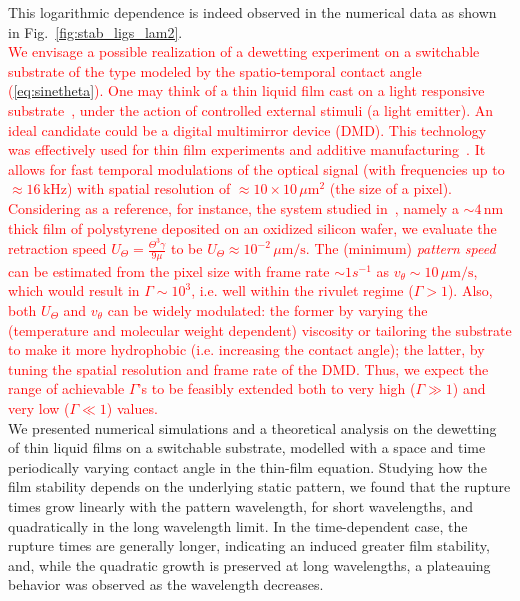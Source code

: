 \documentclass[twocolumn,amsmath,amssymb,showpacs,prl,superscriptaddress]{revtex4-1} %
\newcommand{\REV}[1]{\textcolor{red}{#1}}
\begin{document}
This logarithmic dependence is indeed observed in the numerical data as shown in Fig.~\ref{fig:stab_ligs_lam2}.\\
\REV{We envisage a possible realization of a 
dewetting experiment on a switchable substrate of the type modeled by the spatio-temporal 
contact angle (\ref{eq:sinetheta}). One may think of a thin liquid film cast on a light responsive substrate~\cite{IchimuraEtAl_Science2000}, under the action of controlled 
external stimuli (a light emitter). 
An ideal candidate could be a digital multimirror device (DMD).
This technology was effectively used for thin film experiments and additive manufacturing~\cite{doi:10.1021/jp301092y, doi:10.1126/science.aax8760}. It allows for fast temporal modulations of the optical signal (with frequencies up to $\approx 16 \, \text{kHz}$)
with spatial resolution of $\approx 10 \times 10 \, \mu \text{m}^2$ (the size of a pixel).
Considering as a reference, for instance, the system studied in~\cite{becker2003complex,PhysRevLett.99.114503}, namely a $\sim 4 \, \text{nm}$ thick film 
of polystyrene deposited on an oxidized silicon wafer,  
we evaluate the retraction speed 
$U_{\Theta} = \frac{\Theta^3 \gamma}{9 \mu}$ to be 
$U_{\Theta} \approx 10^{-2} \, \mu \text{m}/\text{s}$. 
The (minimum) {\it pattern speed} can be 
estimated from the pixel size with frame rate $\sim 1 s^{-1}$ as 
$v_{\theta} \sim 10 \, \mu \text{m}/\text{s}$, which  would result in $\Gamma \sim 10^3$, i.e. well within the rivulet regime ($\Gamma > 1$). Also, both $U_{\Theta}$ and $v_{\theta}$ can be widely modulated: the former by varying the (temperature and molecular weight dependent) viscosity 
or tailoring the substrate to make it more hydrophobic (i.e. increasing the contact angle); the latter, by tuning
the spatial resolution and frame rate of the DMD. Thus, we expect the range of achievable $\Gamma$'s to 
be feasibly extended both to very high ($\Gamma \gg 1$) and very low ($\Gamma \ll 1$) values.}\\
We presented numerical simulations and a theoretical analysis on the dewetting of thin liquid films on a switchable substrate, modelled with a space and time periodically varying contact angle in the thin-film equation.
Studying how the film stability depends on the underlying static pattern, we found that the rupture times grow linearly with the pattern wavelength, for short wavelengths, and quadratically in the long wavelength limit. 
In the time-dependent case, the rupture times are generally longer, indicating an induced greater film stability, and, while the quadratic growth is preserved at long wavelengths, a plateauing behavior was observed as the wavelength decreases. 
\end{document}
